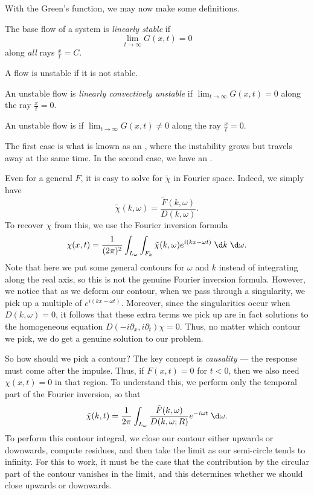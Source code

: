 \documentclass[a4paper]{article}
\begin{document}
With the Green's function, we may now make some definitions.
\begin{defi}
  The base flow of a system is \emph{linearly stable} if
  \[
    \lim_{t \to \infty} G(x, t) = 0
  \]
  along \emph{all} rays $\frac{x}{t} = C$.

  A flow is unstable if it is not stable.
\end{defi}

\begin{defi}
  An unstable flow is \emph{linearly convectively unstable} if $\lim_{t \to \infty}G(x, t) = 0$ along the ray $\frac{x}{t} = 0$.
\end{defi}
\begin{defi}
  An unstable flow is  if $\lim_{t\to \infty}G(x, t) \not= 0$ along the ray $\frac{x}{t} = 0$.
\end{defi}

The first case is what is known as an , where the instability grows but travels away at the same time. In the second case, we have an .

Even for a general $F$, it is easy to solve for $\tilde{\chi}$ in Fourier space. Indeed, we simply have
\[
  \tilde{\chi}(k, \omega) = \frac{\tilde{F}(k, \omega)}{D(k, \omega)}.
\]
To recover $\chi$ from this, we use the Fourier inversion formula
\[
  \chi(x, t) = \frac{1}{(2\pi)^2} \int_{L_\omega} \int_{F_k} \tilde{\chi}(k, \omega) e^{i(kx - \omega t)}\;\d k\;\d \omega.
\]
Note that here we put some general contours for $\omega$ and $k$ instead of integrating along the real axis, so this is not the genuine Fourier inversion formula. However, we notice that as we deform our contour, when we pass through a singularity, we pick up a multiple of $e^{i(kx - \omega t)}$. Moreover, since the singularities occur when $D(k, \omega) = 0$, it follows that these extra terms we pick up are in fact solutions to the homogeneous equation $D(-i\partial_x, i\partial_t) \chi = 0$. Thus, no matter which contour we pick, we do get a genuine solution to our problem.

So how should we pick a contour? The key concept is \emph{causality} --- the response must come after the impulse. Thus, if $F(x, t) = 0$ for $t < 0$, then we also need $\chi(x, t) = 0$ in that region. To understand this, we perform only the temporal part of the Fourier inversion, so that
\[
  \tilde{\chi}(k, t) = \frac{1}{2\pi}\int_{L_\omega} \frac{\tilde{F}(k, \omega)}{D(k, \omega; R)} e^{-i\omega t}\;\d \omega.
\]
To perform this contour integral, we close our contour either upwards or downwards, compute residues, and then take the limit as our semi-circle tends to infinity. For this to work, it must be the case that the contribution by the circular part of the contour vanishes in the limit, and this determines whether we should close upwards or downwards.
\end{document}
